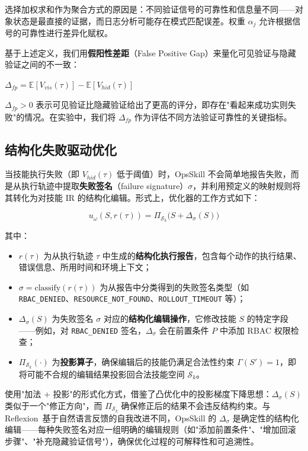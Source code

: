 \documentclass[11pt,a4paper]{ctexart}
\begin{document}
\noindent 选择加权求和作为聚合方式的原因是：不同验证信号的可靠性和信息量不同——对象状态是最直接的证据，而日志分析可能存在模式匹配误差。权重 $\alpha_j$ 允许根据信号的可靠性进行差异化赋权。

基于上述定义，我们用\textbf{假阳性差距}（False Positive Gap）来量化可见验证与隐藏验证之间的不一致：

\noindent $\Delta_{fp} = \mathbb{E}[V_{vis}(\tau)] - \mathbb{E}[V_{hid}(\tau)]$

\noindent $\Delta_{fp} > 0$ 表示可见验证比隐藏验证给出了更高的评分，即存在"看起来成功实则失败"的情况。在实验中，我们将 $\Delta_{fp}$ 作为评估不同方法验证可靠性的关键指标。

\subsection{结构化失败驱动优化}

当技能执行失败（即 $V_{hid}(\tau)$ 低于阈值）时，OpsSkill 不会简单地报告失败，而是从执行轨迹中提取\textbf{失败签名}（failure signature）$\sigma$，并利用预定义的映射规则将其转化为对技能 IR 的结构化编辑。形式上，优化器的工作方式如下：

\begin{equation}
u_\omega(S, r(\tau)) = \Pi_{\mathcal{S}_k}\big(S + \Delta_{\sigma}(S)\big)
\end{equation}

\noindent 其中：
\begin{itemize}[leftmargin=2em]
  \item $r(\tau)$ 为从执行轨迹 $\tau$ 中生成的\textbf{结构化执行报告}，包含每个动作的执行结果、错误信息、所用时间和环境上下文；
  \item $\sigma = \text{classify}(r(\tau))$ 为从报告中分类得到的失败签名类型（如 \texttt{RBAC\_DENIED}、\texttt{RESOURCE\_NOT\_FOUND}、\texttt{ROLLOUT\_TIMEOUT} 等）；
  \item $\Delta_\sigma(S)$ 为失败签名 $\sigma$ 对应的\textbf{结构化编辑操作}，它修改技能 $S$ 的特定字段——例如，对 \texttt{RBAC\_DENIED} 签名，$\Delta_\sigma$ 会在前置条件 $P$ 中添加 RBAC 权限检查；
  \item $\Pi_{\mathcal{S}_k}(\cdot)$ 为\textbf{投影算子}，确保编辑后的技能仍满足合法性约束 $\Gamma(S')=1$，即将可能不合规的编辑结果投影回合法技能空间 $\mathcal{S}_k$。
\end{itemize}

\noindent 使用"加法 + 投影"的形式化方式，借鉴了凸优化中的投影梯度下降思想：$\Delta_\sigma(S)$ 类似于一个"修正方向"，而 $\Pi_{\mathcal{S}_k}$ 确保修正后的结果不会违反结构约束。与 Reflexion~\cite{shinn2023reflexion}基于自然语言反馈的自我改进不同，OpsSkill 的 $\Delta_\sigma$ 是确定性的结构化编辑——每种失败签名对应一组明确的编辑规则（如"添加前置条件"、"增加回滚步骤"、"补充隐藏验证信号"），确保优化过程的可解释性和可追溯性。
\end{document}
